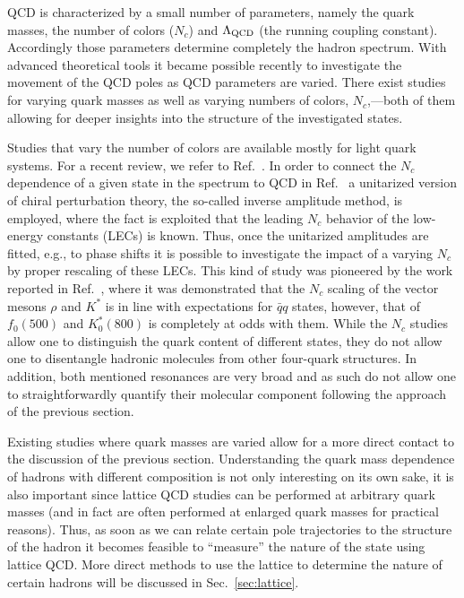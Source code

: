 QCD is characterized by a small number of parameters, namely the quark masses,
the number of colors ($N_c$) and $\Lambda_{\rm QCD}$ (the running coupling constant).
Accordingly those parameters determine completely the hadron spectrum. With
advanced theoretical tools it became possible recently to investigate the
movement of the QCD poles as QCD parameters are varied. There exist studies for
varying quark masses as well as varying numbers of colors, $N_c$,---both of them
allowing for deeper insights into the structure of the investigated states.

Studies that vary the number of colors are available mostly for light quark
systems. For a recent review, we refer to Ref.~\cite{Pelaez:2015qba}. In order
to connect the $N_c$ dependence of a given state in the spectrum to QCD in
Ref.~\cite{Pelaez:2015qba} a unitarized version of chiral perturbation theory,
the so-called inverse amplitude method, is employed, where the fact is exploited
that the leading $N_c$ behavior of the low-energy constants (LECs) is known.
Thus, once the unitarized amplitudes are fitted, e.g., to phase shifts it is
possible to investigate the impact of a varying $N_c$ by proper rescaling of
these LECs.
This kind of study was pioneered by the work reported in
Ref.~\cite{Pelaez:2003dy}, where it was demonstrated that the $N_c$ scaling of
the vector mesons $\rho$ and $K^*$ is in line with expectations for $\bar qq$
states, however,  that of $f_0(500)$  and $K_0^*(800)$ is completely at odds
with them. While the $N_c$ studies allow one to distinguish the quark content of
different states, they do not allow one to disentangle hadronic molecules from
other four-quark structures. In addition, both mentioned resonances are very
broad and as such do not allow one to straightforwardly quantify their molecular
component following the approach of the previous section.

Existing studies where quark masses are varied allow for a more direct contact
to the discussion of the previous section.
Understanding the quark mass dependence of hadrons with different composition is
not only interesting on its own sake, it is also important since lattice QCD
studies can be performed at arbitrary quark masses (and in fact are often
performed at enlarged quark masses {for practical reasons}).
Thus, as soon as we can relate certain pole trajectories to the structure of
the hadron it becomes feasible to ``measure'' the nature of the state using
lattice QCD.
More direct methods to use the lattice to determine the nature of certain
hadrons will be discussed in Sec.~\ref{sec:lattice}.

